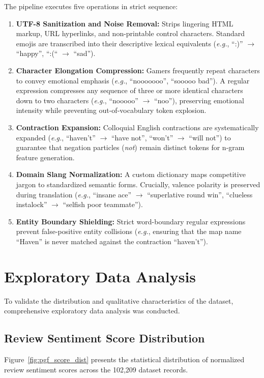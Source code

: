 The pipeline executes five operations in strict sequence:
\begin{enumerate}
    \item \textbf{UTF-8 Sanitization and Noise Removal:} Strips lingering HTML markup, URL hyperlinks, and non-printable control characters. Standard emojis are transcribed into their descriptive lexical equivalents (\textit{e.g.}, ``:)'' $\to$ ``happy'', ``:(`` $\to$ ``sad'').
    \item \textbf{Character Elongation Compression:} Gamers frequently repeat characters to convey emotional emphasis (\textit{e.g.}, ``nooooooo'', ``sooooo bad''). A regular expression compresses any sequence of three or more identical characters down to two characters (\textit{e.g.}, ``nooooo'' $\to$ ``noo''), preserving emotional intensity while preventing out-of-vocabulary token explosion.
    \item \textbf{Contraction Expansion:} Colloquial English contractions are systematically expanded (\textit{e.g.}, ``haven't'' $\to$ ``have not'', ``won't'' $\to$ ``will not'') to guarantee that negation particles (\textit{not}) remain distinct tokens for n-gram feature generation.
    \item \textbf{Domain Slang Normalization:} A custom dictionary maps competitive jargon to standardized semantic forms. Crucially, valence polarity is preserved during translation (\textit{e.g.}, ``insane ace'' $\to$ ``superlative round win'', ``clueless instalock'' $\to$ ``selfish poor teammate'').
    \item \textbf{Entity Boundary Shielding:} Strict word-boundary regular expressions prevent false-positive entity collisions (\textit{e.g.}, ensuring that the map name ``Haven'' is never matched against the contraction ``haven't'').
\end{enumerate}

\section{Exploratory Data Analysis}
\label{sec:eda}

To validate the distribution and qualitative characteristics of the dataset, comprehensive exploratory data analysis was conducted.

\subsection{Review Sentiment Score Distribution}
Figure~\ref{fig:pgf_score_dist} presents the statistical distribution of normalized review sentiment scores across the 102,209 dataset records.

